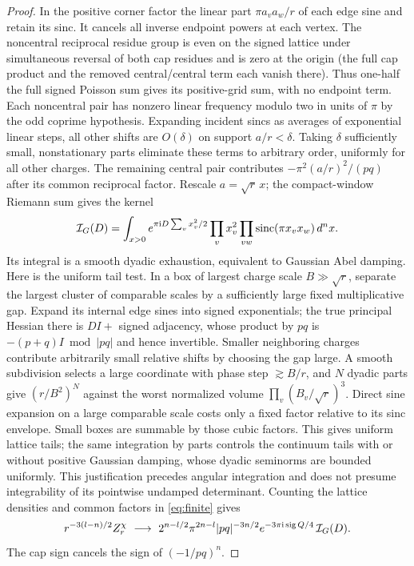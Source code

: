 \begin{proof}
In the positive corner factor the linear part \(\pi a_va_w/r\) of each edge sine and retain its sinc. It cancels all inverse endpoint powers at each vertex. The noncentral reciprocal residue group is even on the signed lattice under simultaneous reversal of both cap residues and is zero at the origin (the full cap product and the removed central/central term each vanish there). Thus one-half the full signed Poisson sum gives its positive-grid sum, with no endpoint term. Each noncentral pair has nonzero linear frequency modulo two in units of \(\pi\) by the odd coprime hypothesis. Expanding incident sincs as averages of exponential linear steps, all other shifts are \(O(\delta)\) on support \(a/r<\delta\). Taking \(\delta\) sufficiently small, nonstationary parts eliminate these terms to arbitrary order, uniformly for all other charges. The remaining central pair contributes \(-\pi^2(a/r)^2/(pq)\) after its common reciprocal factor. Rescale \(a=\sqrt r\,x\); the compact-window Riemann sum gives the kernel
\[
 {\cal I}_G(D)=\int_{x>0}e^{\pi\mathrm i D\sum_vx_v^2/2}
             \prod_v x_v^2\prod_{vw}\operatorname{sinc}(\pi x_vx_w)\,d^nx .
\]
Its integral is a smooth dyadic exhaustion, equivalent to Gaussian Abel damping. Here is the uniform tail test. In a box of largest charge scale \(B\gg\sqrt r\), separate the largest cluster of comparable scales by a sufficiently large fixed multiplicative gap. Expand its internal edge sines into signed exponentials; the true principal Hessian there is \(DI+\) signed adjacency, whose product by \(pq\) is \(-(p+q)I\bmod |pq|\) and hence invertible. Smaller neighboring charges contribute arbitrarily small relative shifts by choosing the gap large. A smooth subdivision selects a large coordinate with phase step \(\gtrsim B/r\), and \(N\) dyadic parts give \((r/B^2)^N\) against the worst normalized volume \(\prod_v(B_v/\sqrt r)^3\). Direct sine expansion on a large comparable scale costs only a fixed factor relative to its sinc envelope. Small boxes are summable by those cubic factors. This gives uniform lattice tails; the same integration by parts controls the continuum tails with or without positive Gaussian damping, whose dyadic seminorms are bounded uniformly. This justification precedes angular integration and does not presume integrability of its pointwise undamped determinant. Counting the lattice densities and common factors in \eqref{eq:finite} gives
\[
 r^{-3(l-n)/2}Z_r^\chi
 \ \longrightarrow\
 2^{n-l/2}\pi^{2n-l}|pq|^{-3n/2}e^{-3\pi\mathrm i\operatorname{sig} Q/4}\,{\cal I}_G(D).
\]
The cap sign cancels the sign of \((-1/pq)^n\).


\end{proof}
